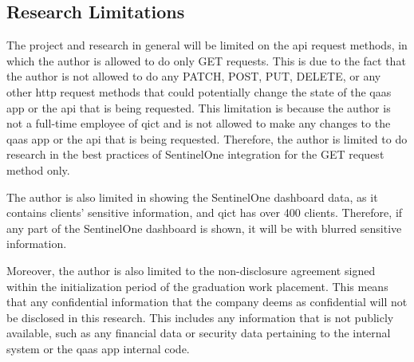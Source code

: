 \begin{multicols}{2}
  \subsection{Research Limitations}
  The project and research in general will be limited on the \acrshort{api} request methods, in which the author
  is allowed to do only GET requests. This is due to the fact that the author is not allowed to do any PATCH,
  POST, PUT, DELETE, or any other \acrshort{http} request methods that could potentially change the state of the
  \acrshort{qaas} app or the \acrshort{api} that is being requested. This limitation is because the author is not a
  full-time employee of \acrshort{qict} and is not allowed to make any changes to the \acrshort{qaas} app or the
  \acrshort{api} that is being requested. Therefore, the author is limited to do research in the best practices
  of SentinelOne integration for the GET request method only.

  The author is also limited in showing the SentinelOne dashboard data, as it contains clients' sensitive
  information, and \acrshort{qict} has over 400 clients. Therefore, if any part of the SentinelOne dashboard is
  shown, it will be with blurred sensitive information.

  Moreover, the author is also limited to the non-disclosure agreement signed within the initialization period of
  the graduation work placement. This means that any confidential information that the company deems as confidential
  will not be disclosed in this research. This includes any information that is not publicly available, such as any
  financial data or security data pertaining to the internal system or the \acrshort{qaas} app internal code.
\end{multicols}

